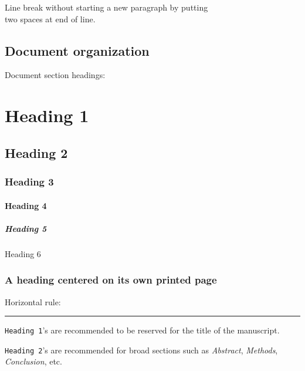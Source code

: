 Line break without starting a new paragraph by putting\\
two spaces at end of line.

\hypertarget{document-organization}{%
\subsection{Document organization}\label{document-organization}}

Document section headings:

\hypertarget{heading-1}{%
\section{Heading 1}\label{heading-1}}

\hypertarget{heading-2}{%
\subsection{Heading 2}\label{heading-2}}

\hypertarget{heading-3}{%
\subsubsection{Heading 3}\label{heading-3}}

\hypertarget{heading-4}{%
\paragraph{Heading 4}\label{heading-4}}

\hypertarget{heading-5}{%
\subparagraph{Heading 5}\label{heading-5}}

Heading 6

\hypertarget{a-heading-centered-on-its-own-printed-page}{%
\subsubsection{A heading centered on its own printed page}\label{a-heading-centered-on-its-own-printed-page}}

Horizontal rule:

\begin{center}\rule{0.5\linewidth}{0.5pt}\end{center}

\texttt{Heading\ 1}'s are recommended to be reserved for the title of the manuscript.

\texttt{Heading\ 2}'s are recommended for broad sections such as \emph{Abstract}, \emph{Methods}, \emph{Conclusion}, etc.


